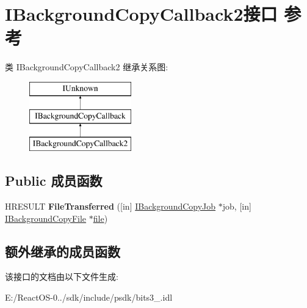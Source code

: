 \hypertarget{interface_i_background_copy_callback2}{}\section{I\+Background\+Copy\+Callback2接口 参考}
\label{interface_i_background_copy_callback2}
类 I\+Background\+Copy\+Callback2 继承关系图\+:\begin{figure}[H]
\begin{center}
\leavevmode
\includegraphics[height=3.000000cm]{interface_i_background_copy_callback2}
\end{center}
\end{figure}
\subsection*{Public 成员函数}
\begin{DoxyCompactItemize}
\item 
\mbox{\label{interface_i_background_copy_callback2_a866c1614fb6d9945e680f6489d750492}} 
H\+R\+E\+S\+U\+LT {\bfseries File\+Transferred} (\mbox{[}in\mbox{]} \hyperlink{interface_i_background_copy_job}{I\+Background\+Copy\+Job} $\ast$job, \mbox{[}in\mbox{]} \hyperlink{interface_i_background_copy_file}{I\+Background\+Copy\+File} $\ast$\hyperlink{structfile}{file})
\end{DoxyCompactItemize}
\subsection*{额外继承的成员函数}


该接口的文档由以下文件生成\+:\begin{DoxyCompactItemize}
\item 
E\+:/\+React\+O\+S-\/0../sdk/include/psdk/bits3\+\_.\+idl\end{DoxyCompactItemize}
